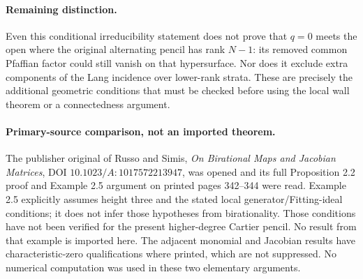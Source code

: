 \paragraph{Remaining distinction.}
Even this conditional irreducibility statement does not prove that
\(q=0\) meets the open where the original alternating pencil has
rank \(N-1\): its removed common Pfaffian factor could still vanish
on that hypersurface.  Nor does it exclude extra components of the
Lang incidence over lower-rank strata.  These are precisely the
additional geometric conditions that must be checked before using
the local wall theorem or a connectedness argument.

\paragraph{Primary-source comparison, not an imported theorem.}
The publisher original of Russo and Simis, \emph{On Birational Maps
and Jacobian Matrices}, DOI \(10.1023/A:1017572213947\), was opened
and its full Proposition 2.2 proof and Example 2.5 argument on
printed pages 342--344 were read.  Example 2.5 explicitly assumes
height three and the stated local generator/Fitting-ideal conditions;
it does not infer those hypotheses from birationality.  Those
conditions have not been verified for the present higher-degree
Cartier pencil.  No result from that example is imported here.
The adjacent monomial and Jacobian results have characteristic-zero
qualifications where printed, which are not suppressed.
No numerical computation was used in these two elementary arguments.
